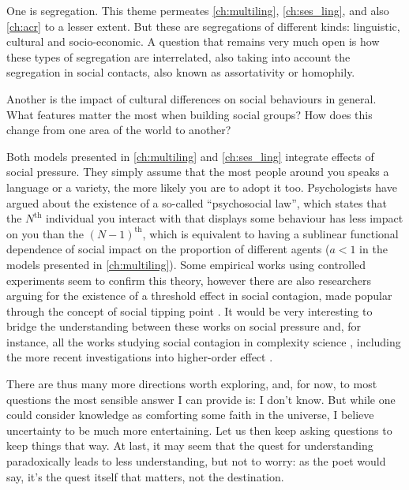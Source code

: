 \documentclass[../thesis.tex]{subfiles}
\begin{document}
One is segregation. This theme permeates \cref{ch:multiling},
\cref{ch:ses_ling}, and also \cref{ch:acr} to a lesser extent. But these are
segregations of different kinds: linguistic, cultural and socio-economic. A question
that remains very much open is how these types of segregation are interrelated, also
taking into account the segregation in social contacts, also known as assortativity or
homophily.

Another is the impact of cultural differences on social behaviours in general. What
features matter the most when building social groups? How does this change from one area
of the world to another?

Both models presented in \cref{ch:multiling} and \cref{ch:ses_ling} integrate effects of
social pressure. They simply assume that the most people around you speaks a language or
a variety, the more likely you are to adopt it too. Psychologists have argued about the
existence of a so-called ``psychosocial law'', which states that the $N^\text{th}$
individual you interact with that displays some behaviour has less impact on you than
the $(N - 1)^\text{th}$, which is equivalent to having a sublinear functional dependence
of social impact on the proportion of different agents ($a < 1$ in the models presented
in \cref{ch:multiling}). Some empirical works using controlled experiments seem to
confirm this theory, however there are also researchers arguing for the existence of a
threshold effect in social contagion, made popular through the concept of social tipping
point \cite{MilkoreitDefiningTipping2018}. It would be very interesting to bridge the
understanding between these works on social pressure and, for instance, all the works
studying social contagion in complexity science \cite{WattsInfluentialsNetworks2007},
including the more recent investigations into higher-order effect
\cite{IacopiniSimplicialModels2019}.

There are thus many more directions worth exploring, and, for now, to most questions the
most sensible answer I can provide is: I don't know. But while one could consider
knowledge as comforting some faith in the universe, I believe uncertainty to be much
more entertaining. Let us then keep asking questions to keep things that way.
At last, it may seem that the quest for understanding paradoxically leads to less
understanding, but not to worry:
as the poet would say,
it's the quest itself that matters, not the destination.
\end{document}
